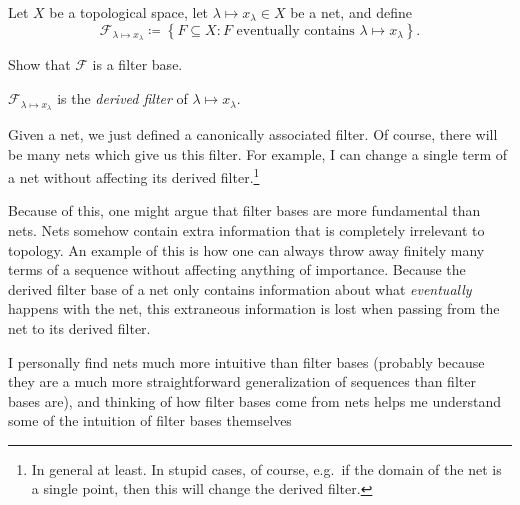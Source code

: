 \begin{dfn}\label{DerivedFilterBase}
Let $X$ be a topological space, let $\lambda \mapsto x_\lambda \in X$ be a net, and define
\begin{equation}
\mathcal{F}_{\lambda \mapsto x_\lambda}\coloneqq \left\{ F\subseteq X:F\text{ eventually contains }\lambda \mapsto x_\lambda \right\} .
\end{equation}
\begin{exr}
Show that $\mathcal{F}$ is a filter base.
\end{exr}
$\mathcal{F}_{\lambda \mapsto x_\lambda}$ is the \emph{derived filter} of $\lambda \mapsto x_\lambda$.
\begin{rmk}
Given a net, we just defined a canonically associated filter.  Of course, there will be many nets which give us this filter.  For example, I can change a single term of a net without affecting its derived filter.\footnote{In general at least.  In stupid cases, of course, e.g.~if the domain of the net is a single point, then this will change the derived filter.}
\end{rmk}
\begin{rmk}
Because of this, one might argue that filter bases are more fundamental than nets.  Nets somehow contain extra information that is completely irrelevant to topology.  An example of this is how one can always throw away finitely many terms of a sequence without affecting anything of importance.  Because the derived filter base of a net only contains information about what \emph{eventually} happens with the net, this extraneous information is lost when passing from the net to its derived filter.
\end{rmk}
\begin{rmk}
I personally find nets much more intuitive than filter bases (probably because they are a much more straightforward generalization of sequences than filter bases are), and thinking of how filter bases come from nets helps me understand some of the intuition of filter bases themselves
\end{rmk}
\end{dfn}

